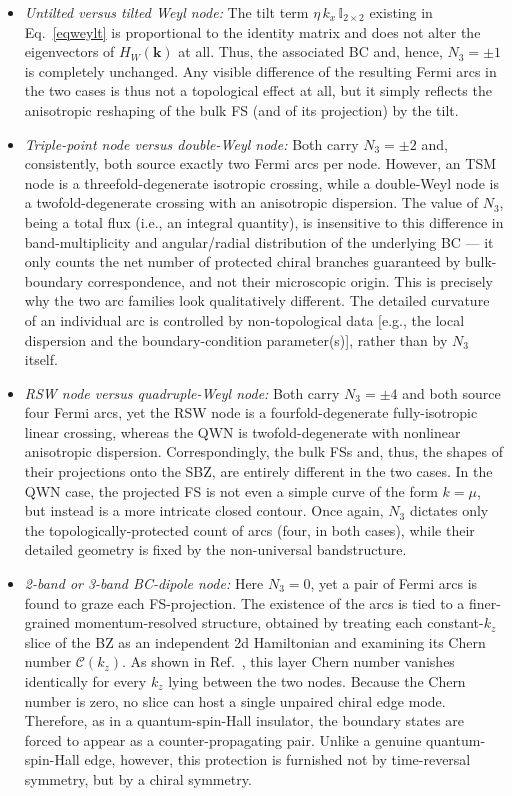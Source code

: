 \documentclass[aps,prb,onecolumn, footinbib, 10pt]{revtex4-2}
\begin{document}
\begin{itemize}


\item \textit{Untilted versus tilted Weyl node:} The tilt term $\eta\, k_x\, \mathbb{I}_{2\times2}$ existing in Eq.~\eqref{eqweylt} is proportional to the identity matrix and does not alter the eigenvectors of $H_W(\boldsymbol{k})$ at all. Thus, the associated BC and, hence, $N_3=\pm1$ is completely unchanged. Any visible difference of the resulting Fermi arcs in the two cases is thus not a topological effect at all, but it simply reflects the anisotropic reshaping of the bulk FS (and of its projection) by the tilt.

\item \textit{Triple-point node versus double-Weyl node:} Both carry $N_3=\pm2$ and, consistently, both source exactly two Fermi arcs per node. However, an TSM node is a threefold-degenerate isotropic crossing, while a double-Weyl node is a twofold-degenerate crossing with an anisotropic dispersion. The value of $N_3$, being a total flux (i.e., an integral quantity), is insensitive to this difference in band-multiplicity and angular/radial distribution of the underlying BC --- it only counts the net number of protected chiral branches guaranteed by bulk-boundary correspondence, and not their microscopic origin. This is precisely why the two arc families look qualitatively different. The detailed curvature of an individual arc is controlled by non-topological data [e.g., the local dispersion and the boundary-condition parameter(s)], rather than by $N_3$ itself.

\item \textit{RSW node versus quadruple-Weyl node:} Both carry $N_3=\pm4$ and both source four Fermi arcs, yet the RSW node is a fourfold-degenerate fully-isotropic linear crossing, whereas the QWN is twofold-degenerate with nonlinear anisotropic dispersion. Correspondingly, the bulk FSs and, thus, the shapes of their projections onto the SBZ, are entirely different in the two cases. In the QWN case, the projected FS is not even a simple curve of the form $k=\mu$, but instead is a more intricate closed contour. Once again, $N_3$ dictates only the topologically-protected count of arcs (four, in both cases), while their detailed geometry is fixed by the non-universal bandstructure.

\item \textit{2-band or 3-band BC-dipole node:} Here $N_3=0$, yet a pair of Fermi arcs is found to graze each FS-projection. The existence of the arcs is tied to a finer-grained momentum-resolved structure, obtained by treating each constant-$k_z$ slice of the BZ as an independent 2d Hamiltonian and examining its Chern number $\mathcal C(k_z)$. As shown in Ref.~\cite{twoband-dipole}, this layer Chern number vanishes identically for every $k_z$ lying between the two nodes. Because the Chern number is zero, no slice can host a single unpaired chiral edge mode. Therefore, as in a quantum-spin-Hall insulator, the boundary states are forced to appear as a counter-propagating pair. Unlike a genuine quantum-spin-Hall edge, however, this protection is furnished not by time-reversal symmetry, but by a chiral symmetry.

\end{itemize}
\end{document}
